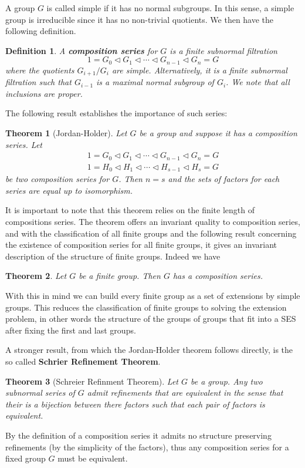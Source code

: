 \documentclass{report}
\newtheorem{theorem}{Theorem}
\newtheorem{defi}{Definition}
\begin{document}
\begin{singlespace}
\begin{enumerate}
  A group $G$ is called simple if it has no normal subgroups. In this sense, a simple group is irreducible since it has no non-trivial quotients. We then have the following definition.
  \begin{defi}
    A \textbf{composition series} for $G$ is a \textit{finite} subnormal filtration
    \[
      1=G_0\triangleleft G_1\triangleleft\cdots\triangleleft G_{n-1}\triangleleft G_n=G
    \]
    where the quotients $G_{i+1}/G_i$ are simple. Alternatively, it is a finite subnormal filtration such that $G_{i-1}$ is a maximal normal subgroup of $G_i$. We note that all inclusions are proper.
  \end{defi}
  The following result establishes the importance of such series:
  \begin{theorem}[Jordan-Holder]
    Let $G$ be a group and suppose it has a composition series. Let
    \begin{align*}
      1=G_0\triangleleft G_1\triangleleft\cdots\triangleleft G_{n-1}\triangleleft G_n=G \\
      1=H_0\triangleleft H_1\triangleleft\cdots\triangleleft H_{s-1}\triangleleft H_s=G
    \end{align*}
    be two composition series for $G$. Then $n=s$ and the sets of factors for each series are equal up to isomorphism.
  \end{theorem}
  It is important to note that this theorem relies on the finite length of compositions series. The theorem offers an invariant quality to composition series, and with the classification of all finite groups and the following result concerning the existence of composition series for all finite groups, it gives an invariant description of the structure of finite groups. Indeed we have
  \begin{theorem}
    Let $G$ be a finite group. Then $G$ has a composition series.
  \end{theorem}
  With this in mind we can build every finite group as a set of extensions by simple groups. This reduces the classification of finite groups to solving the extension problem, in other words the structure of the groups of groups that fit into a SES after fixing the first and last groups.

  
  A stronger result, from which the Jordan-Holder theorem follows directly, is the so called \textbf{Schrier Refinement Theorem}.
  \begin{theorem}[Schreier Refinment Theorem]
    Let $G$ be a group. Any two subnormal series of $G$ admit refinements that are equivalent in the sense that their is a bijection between there factors such that each pair of factors is equivalent.
  \end{theorem}
  By the definition of a composition series it admits no structure preserving refinements (by the simplicity of the factors), thus any composition series for a fixed group $G$ must be equivalent.


\end{enumerate}
\end{singlespace}
\end{document}

